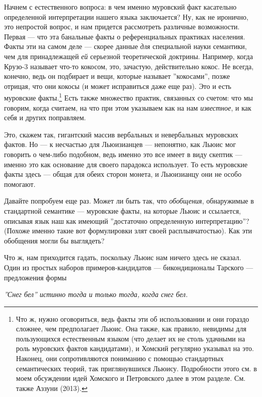 \documentclass[11pt]{book}
\begin{document}
Начнем с естественного вопроса: в чем именно муровский факт касательно определенной интерпретации нашего языка заключается? Ну, как не иронично, это непростой вопрос, и нам придется рассмотреть различные возможности. Первая --- что эта банальные факты о референциальных практиках населения. Факты эти на самом деле --- скорее данные \textit{для} специальной науки семантики, чем для принадлежащей \textit{ей} серьезной теоретической доктрины. Например, когда Крузо-3 называет что-то кокосом, это, зачастую, действительно кокос. Не всегда, конечно, ведь он подбирает и вещи, которые называет ''кокосами'', позже отрицая, что они кокосы (и может исправиться даже еще раз). Это и есть муровские факты.\footnote{Что ж, нужно оговориться, ведь факты эти об использовании и они гораздо сложнее, чем предполагает Льюис. Она также, как правило, невидимы для пользующихся естественным языком (что делает их не столь удачными на роль муровских фактов кандидатами), и Хомский регулярно указывал на это. Наконец, они сопротивляются пониманию с помощью стандартных семантических теорий, так приглянувшихся Льюису. Подробности этого см. в моем обсуждении идей Хомского и Петровского далее в этом разделе. См. также Аззуни (2013).} Есть также множество практик, связанных со счетом: что мы говорим, когда считаем, на что при этом указываем как на нам \textit{известное}, и как себя и других поправляем.

Это, скажем так, гигантский массив вербальных и невербальных муровских фактов. Но --- к несчастью для Льюизианцев --- непонятно, как Льюис мог говорить о чем-либо подобном, ведь именно это все имеет в виду скептик --- именно это как основание для своего парадокса использует. То есть муровские факты здесь --- общая для обеих сторон монета, и Льюизианцу они не особо помогают.

Давайте попробуем еще раз. Может ли быть так, что \textit{обобщения}, обнаружимые в стандартной семантике --- муровские факты, на которые Льюис и ссылается, описывая язык наш как имеющий ''достаточно определенную интерпретацию''? (Похоже именно такие вот формулировки злят своей расплывчатостью). Как эти обобщения могли бы выглядеть?

Что ж, нам приходится гадать, поскольку Льюис нам ничего здесь не сказал. Один из простых наборов примеров-кандидатов --- бикондиционалы Тарского --- предложения формы

\smallskip

\textit{''Снег бел'' истинно тогда и только тогда, когда снег бел.}

\smallskip
\end{document}
